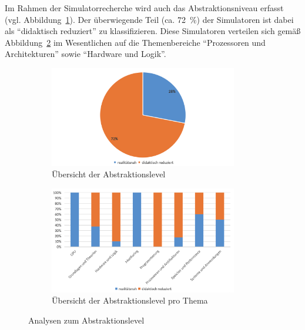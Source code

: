 Im Rahmen der Simulatorrecherche wird auch das Abstraktionsniveau erfasst (vgl. Abbildung~\ref{fig:5-abstraktion}). Der überwiegende Teil (ca. 72~\%) der Simulatoren ist dabei als \enquote{didaktisch reduziert} zu klassifizieren. Diese Simulatoren verteilen sich gemäß Abbildung~\ref{fig:6-abstraktion-thema} im Wesentlichen auf die Themenbereiche \enquote{Prozessoren und Architekturen} sowie \enquote{Hardware und Logik}.

\begin{figure}[!htbp]
    \centering
    \begin{subfigure}[b]{0.48\textwidth}
        \centering
        \includegraphics[width=0.90\textwidth]{graphics_sim/5-abstraktion.png}
        \caption{Übersicht der Abstraktionslevel}
        \label{fig:5-abstraktion}
    \end{subfigure}
    \hfill
    \begin{subfigure}[b]{0.48\textwidth}
        \centering
        \includegraphics[width=0.90\textwidth]{graphics_sim/6-abstraktion-thema.png}
        \caption{Übersicht der Abstraktionslevel pro Thema}
        \label{fig:6-abstraktion-thema}
    \end{subfigure}
    \caption{Analysen zum Abstraktionslevel}
    \label{fig:abstraktion-gesamt}
\end{figure}

